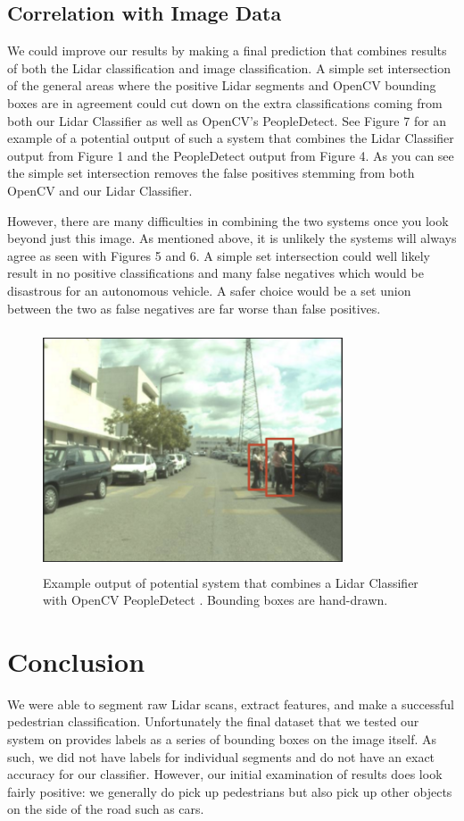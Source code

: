 \documentclass[10pt,twocolumn,letterpaper]{article}
\begin{document}
  \subsection{Correlation with Image Data}
  We could improve our results by making a final prediction that combines
  results of both the Lidar classification and image classification. A simple
  set intersection of the general areas where the positive Lidar segments and OpenCV
  bounding boxes are in agreement could cut down on the extra classifications coming from
  both our Lidar Classifier as well as OpenCV's PeopleDetect. See Figure 7 for an example of a potential
  output of such a system that combines the Lidar Classifier output from Figure 1
  and the PeopleDetect output from Figure 4. As you can see
  the simple set intersection removes the false positives stemming from both OpenCV and
  our Lidar Classifier.

  However, there are many difficulties in combining the two systems once you look
  beyond just this image. As mentioned above, it is unlikely the systems will always
  agree as seen with Figures 5 and 6. A simple set intersection could well likely result
  in no positive classifications and many false negatives which would be disastrous
  for an autonomous vehicle. A safer choice would be a set union between the two as
  false negatives are far worse than false positives.

  \begin{figure}
    \includegraphics[height=2.8in, width=3.5in]{images/futureWork.png}
    \caption{ Example output of potential system that combines a Lidar Classifier
    with OpenCV PeopleDetect \cite{opencv}. Bounding boxes are hand-drawn. }
  \end{figure}

\section{Conclusion}
  We were able to segment raw Lidar scans, extract
  features, and make a successful pedestrian classification.
  Unfortunately the final dataset that
  we tested our system on provides labels as a series of bounding boxes on the
  image itself. As such, we did not have labels for individual segments and do
  not have an exact accuracy for our classifier. However, our initial examination
  of results does look fairly positive: we generally do pick up pedestrians
  but also pick up other objects on the side of the road such as cars.
\end{document}
